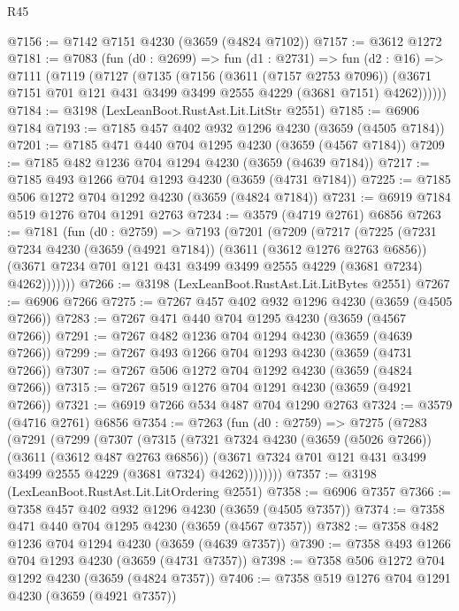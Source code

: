 \begin{lexlean}{R45}
\begin{coremodule}
@7156 := @7142 @7151 @4230 (@3659 (@4824 @7102))
@7157 := @3612 @1272
@7181 := @7083
    (fun (d0 : @2699) =>
    fun (d1 : @2731) =>
    fun (d2 : @16) =>
    @7111
      (@7119
        (@7127
          (@7135
            (@7156
              (@3611 (@7157 @2753 @7096))
              (@3671 @7151 @701 @121 @431 @3499 @3499 @2555 @4229 (@3681 @7151) @4262))))))
@7184 := @3198 (LexLeanBoot.RustAst.Lit.LitStr @2551)
@7185 := @6906 @7184
@7193 := @7185 @457 @402 @932 @1296 @4230 (@3659 (@4505 @7184))
@7201 := @7185 @471 @440 @704 @1295 @4230 (@3659 (@4567 @7184))
@7209 := @7185 @482 @1236 @704 @1294 @4230 (@3659 (@4639 @7184))
@7217 := @7185 @493 @1266 @704 @1293 @4230 (@3659 (@4731 @7184))
@7225 := @7185 @506 @1272 @704 @1292 @4230 (@3659 (@4824 @7184))
@7231 := @6919 @7184 @519 @1276 @704 @1291 @2763
@7234 := @3579 (@4719 @2761) @6856
@7263 := @7181
    (fun (d0 : @2759) =>
    @7193
      (@7201
        (@7209
          (@7217
            (@7225
              (@7231
                @7234
                @4230
                (@3659 (@4921 @7184))
                (@3611 (@3612 @1276 @2763 @6856))
                (@3671 @7234 @701 @121 @431 @3499 @3499 @2555 @4229 (@3681 @7234) @4262)))))))
@7266 := @3198 (LexLeanBoot.RustAst.Lit.LitBytes @2551)
@7267 := @6906 @7266
@7275 := @7267 @457 @402 @932 @1296 @4230 (@3659 (@4505 @7266))
@7283 := @7267 @471 @440 @704 @1295 @4230 (@3659 (@4567 @7266))
@7291 := @7267 @482 @1236 @704 @1294 @4230 (@3659 (@4639 @7266))
@7299 := @7267 @493 @1266 @704 @1293 @4230 (@3659 (@4731 @7266))
@7307 := @7267 @506 @1272 @704 @1292 @4230 (@3659 (@4824 @7266))
@7315 := @7267 @519 @1276 @704 @1291 @4230 (@3659 (@4921 @7266))
@7321 := @6919 @7266 @534 @487 @704 @1290 @2763
@7324 := @3579 (@4716 @2761) @6856
@7354 := @7263
    (fun (d0 : @2759) =>
    @7275
      (@7283
        (@7291
          (@7299
            (@7307
              (@7315
                (@7321
                  @7324
                  @4230
                  (@3659 (@5026 @7266))
                  (@3611 (@3612 @487 @2763 @6856))
                  (@3671 @7324 @701 @121 @431 @3499 @3499 @2555 @4229 (@3681 @7324) @4262))))))))
@7357 := @3198 (LexLeanBoot.RustAst.Lit.LitOrdering @2551)
@7358 := @6906 @7357
@7366 := @7358 @457 @402 @932 @1296 @4230 (@3659 (@4505 @7357))
@7374 := @7358 @471 @440 @704 @1295 @4230 (@3659 (@4567 @7357))
@7382 := @7358 @482 @1236 @704 @1294 @4230 (@3659 (@4639 @7357))
@7390 := @7358 @493 @1266 @704 @1293 @4230 (@3659 (@4731 @7357))
@7398 := @7358 @506 @1272 @704 @1292 @4230 (@3659 (@4824 @7357))
@7406 := @7358 @519 @1276 @704 @1291 @4230 (@3659 (@4921 @7357))

\end{coremodule}
\end{lexlean}
